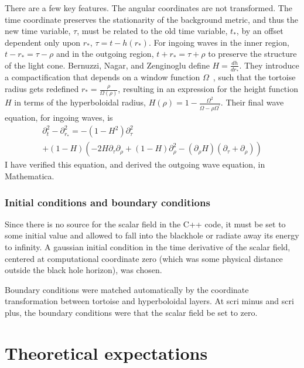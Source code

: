 There are a few key features. The angular coordinates are not transformed. The time coordinate preserves the stationarity of the background metric, and thus the new time variable, $\tau$, must be related to the old time variable, $t_*$, by an offset dependent only upon $r_*$, $\tau=t-h(r_*)$. For ingoing waves in the inner region, $t-r_*=\tau-\rho$ and in the outgoing region, $t+r_*=\tau+\rho$ to preserve the structure of the light cone. Bernuzzi, Nagar, and Zenginoglu define $H=\frac{dh}{dr_*}$. They introduce a compactification that depends on a window function $\Omega$~\cite{OmegaTransferFunction}, such that the tortoise radius gets redefined  $r_*=\frac{\rho}{\Omega(\rho)}$, resulting in an expression for the height function $H$ in terms of the hyperboloidal radius,  $H(\rho)=1-\frac{\Omega^2}{\Omega-\rho\Omega^\prime}$. Their final wave equation, for ingoing waves, is~\cite{hyperboloidalCoordinates}
  \begin{eqnarray}
    \partial_t^2-\partial_{r_*}^2=-(1-H^2)\partial_\tau^2\nonumber\\
    +(1-H)(-2H\partial_\tau\partial_\rho+(1-H)\partial_\rho^2-(\partial_\rho H)(\partial_\tau+\partial_\rho))
  \end{eqnarray}    
I have verified this equation, and derived the outgoing wave equation, in Mathematica.

  



\subsubsection{Initial conditions and boundary conditions}
Since there is no source for the scalar field in the C++ code, it must be set to some initial value and allowed to fall into the blackhole or radiate away its energy to infinity. A gaussian initial condition in the time derivative of the scalar field, centered at computational coordinate zero (which was some physical distance outside the black hole horizon), was chosen.   

Boundary conditions were matched automatically by the coordinate transformation between tortoise and hyperboloidal layers. At scri minus and scri plus, the boundary conditions were that the scalar field be set to zero. 



\section{Theoretical expectations}

